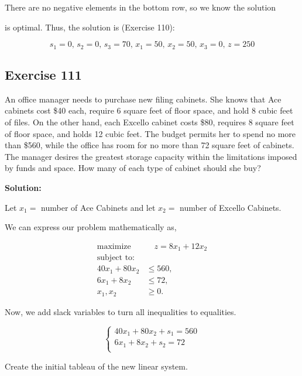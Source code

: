 \documentclass{article}
\begin{document}
There are no negative elements in the bottom row, so we know the solution 

is optimal. Thus, the solution is (Exercise 110):

\begin{equation*}
s_1 = 0, \, s_2 = 0, \, s_3 = 70, \, x_1 = 50, \, x_2 = 50, \, x_3 = 0, \, z = 250
\end{equation*}


\subsection*{Exercise 111}
An office manager needs to purchase new filing cabinets. She knows that Ace cabinets cost \$40 each, require 6 square feet of floor space, and hold 8 cubic feet of files. On the other hand, each Excello cabinet
costs \$80, requires 8 square feet of floor space, and holds 12 cubic feet. The budget permits her to spend no more than \$560, while the office has room for no more than 72 square feet of cabinets. The manager desires the greatest storage capacity within the limitations imposed by funds and space. How many of each type of cabinet should she buy?

\textbf{Solution:}

\vspace{\baselineskip}

Let $x_1 =$ number of Ace Cabinets and let $x_2 =$ number of Excello Cabinets.

\vspace{\baselineskip}

We can express our problem mathematically as,

\begin{align*}
\text{maximize } & \quad z = 8x_1 + 12x_2\\
\text{subject to:} & \\
40x_1 + 80x_2 &\leq 560, \\
6x_1 + 8x_2  &\leq 72, \\
x_1, x_2 &\geq 0.
\end{align*}

Now, we add slack variables to turn all inequalities to equalities.

\[
\left\{
\begin{array}{l}
40x_1 + 80x_2 + s_1 = 560 \\
6x_1 + 8x_2 + s_2 = 72 \\
\end{array}
\right.
\]

Create the initial tableau of the new linear system.
\end{document}
